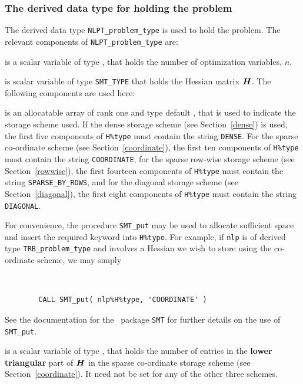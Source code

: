 \documentclass{galahad}
\newcommand{\packagename}{TRB}
\begin{document}

\subsubsection{The derived data type for holding the problem}\label{typeprob}
The derived data type {\tt NLPT\_problem\_type} is used to hold
the problem. The relevant components of
{\tt NLPT\_problem\_type}
are:

\begin{description}

 is a scalar variable of type \integer,
 that holds the number of optimization variables, $n$.

 is scalar variable of type {\tt SMT\_TYPE}
that holds the Hessian matrix ${\bm{H}}$. The following components
are used here:

\begin{description}

 is an allocatable array of rank one and type default
\character, that
is used to indicate the storage scheme used. If the dense storage scheme
(see Section~\ref{dense}) is used,
the first five components of {\tt H\%type} must contain the
string {\tt DENSE}.
For the sparse co-ordinate scheme (see Section~\ref{coordinate}),
the first ten components of {\tt H\%type} must contain the
string {\tt COORDINATE},
for the sparse row-wise storage scheme (see Section~\ref{rowwise}),
the first fourteen components of {\tt H\%type} must contain the
string {\tt SPARSE\_BY\_ROWS},
and for the diagonal storage scheme (see Section~\ref{diagonal}),
the first eight components of {\tt H\%type} must contain the
string {\tt DIAGONAL}.

For convenience, the procedure {\tt SMT\_put}
may be used to allocate sufficient space and insert the required keyword
into {\tt H\%type}.
For example, if {\tt nlp} is of derived type {\tt \packagename\_problem\_type}
and involves a Hessian we wish to store using the co-ordinate scheme,
we may simply
{\tt
\begin{verbatim}
        CALL SMT_put( nlp%H%type, 'COORDINATE' )
\end{verbatim}
}
\noindent
See the documentation for the \galahad\ package {\tt SMT}
for further details on the use of {\tt SMT\_put}.

 is a scalar variable of type \integer, that
holds the number of entries in the {\bf lower triangular} part of ${\bm{H}}$
in the sparse co-ordinate storage scheme (see Section~\ref{coordinate}).
It need not be set for any of the other three schemes.


\end{description}
\end{description}
\end{document}
